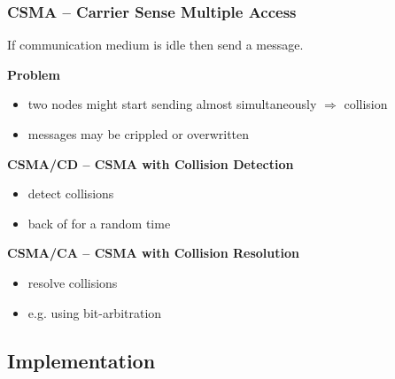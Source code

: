 \documentclass{beamer}
\newcommand{\paragraph}[1]{\vspace{6pt}\textbf{#1}}
\begin{document}
\begin{frame}
  \frametitle{CSMA -- Carrier Sense Multiple Access}
  If communication medium is idle then send a message.
  
  \paragraph{Problem}
  \begin{itemize}
    \item two nodes might start sending almost simultaneously $\Rightarrow$ collision
    \item messages may be crippled or overwritten
  \end{itemize}
  
  \paragraph{CSMA/CD -- CSMA with Collision Detection}
  \begin{itemize}
    \item detect collisions
    \item back of for a random time
  \end{itemize}
  
  \paragraph{CSMA/CA -- CSMA with Collision Resolution}
  \begin{itemize}
    \item resolve collisions
    \item e.g. using bit-arbitration
  \end{itemize}
\end{frame}

\subsection{Implementation}
\end{document}
